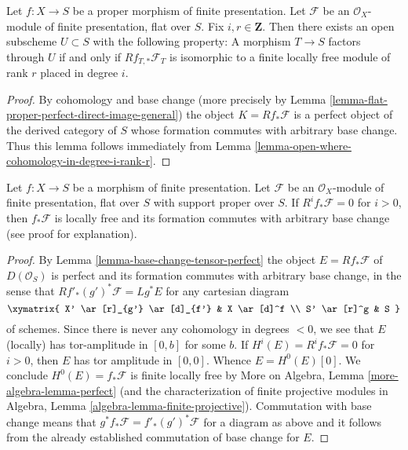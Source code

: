 \begin{lemma}
\label{lemma-open-where-cohomology-in-degree-i-rank-r-geometric}
Let $f : X \to S$ be a proper morphism of finite presentation.
Let $\mathcal{F}$ be an $\mathcal{O}_X$-module of finite presentation,
flat over $S$. Fix $i, r \in \mathbf{Z}$.
Then there exists an open subscheme
$U \subset S$ with the following property:
A morphism $T \to S$ factors through $U$ if and only if
$Rf_{T, *}\mathcal{F}_T$ is isomorphic to a
finite locally free module of rank $r$ placed in degree $i$.
\end{lemma}

\begin{proof}
By cohomology and base change (more precisely by
Lemma \ref{lemma-flat-proper-perfect-direct-image-general})
the object $K = Rf_*\mathcal{F}$ is a perfect object of the derived
category of $S$ whose formation commutes with arbitrary base change.
Thus this lemma follows immediately from
Lemma \ref{lemma-open-where-cohomology-in-degree-i-rank-r}.
\end{proof}

\begin{lemma}
\label{lemma-vanishing-implies-locally-free}
Let $f : X \to S$ be a morphism of finite presentation.
Let $\mathcal{F}$ be an $\mathcal{O}_X$-module of finite presentation,
flat over $S$ with support proper over $S$. If $R^if_*\mathcal{F} = 0$
for $i > 0$, then $f_*\mathcal{F}$ is locally free and its formation
commutes with arbitrary base change (see proof for explanation).
\end{lemma}

\begin{proof}
By Lemma \ref{lemma-base-change-tensor-perfect}
the object $E = Rf_*\mathcal{F}$ of $D(\mathcal{O}_S)$
is perfect and its formation commutes with arbitrary base change,
in the sense that $Rf'_*(g')^*\mathcal{F} = Lg^*E$
for any cartesian diagram
$$
\xymatrix{
X' \ar[r]_{g'} \ar[d]_{f'} &
X \ar[d]^f \\
S' \ar[r]^g &
S
}
$$
of schemes.
Since there is never any cohomology in degrees $< 0$, we see that
$E$ (locally) has tor-amplitude in $[0, b]$ for some $b$.
If $H^i(E) = R^if_*\mathcal{F} = 0$ for $i > 0$,
then $E$ has tor amplitude in $[0, 0]$. Whence
$E = H^0(E)[0]$. We conclude $H^0(E) = f_*\mathcal{F}$
is finite locally free by
More on Algebra, Lemma \ref{more-algebra-lemma-perfect}
(and the characterization of finite projective modules
in Algebra, Lemma \ref{algebra-lemma-finite-projective}).
Commutation with base change means that
$g^*f_*\mathcal{F} = f'_*(g')^*\mathcal{F}$ for
a diagram as above and it follows from the already
established commutation of base change for $E$.
\end{proof}

